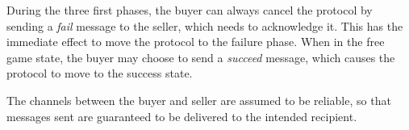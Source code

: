During the three first phases, the buyer can always cancel the protocol by sending a
\emph{fail} message to the seller, which needs to acknowledge it. This has the immediate effect to
move the protocol to the failure phase. When in the free game state, the buyer may choose
to send a \emph{succeed} message, which causes the protocol to move to the success state.

The channels between the buyer and seller are assumed to be reliable, so that messages sent are
guaranteed to be delivered to the intended recipient.
